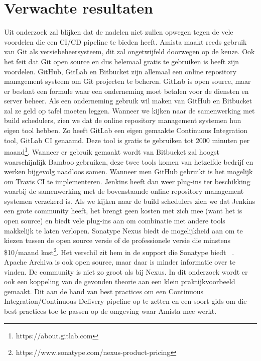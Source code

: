     \section{Verwachte resultaten}
    \label{sec:verwachte_resultaten}
    
    Uit onderzoek zal blijken dat de nadelen niet zullen opwegen tegen de vele voordelen die een CI/CD pipeline te bieden heeft.
    Amista maakt reeds gebruik van Git als versiebeheersysteem, dit zal ongetwijfeld doorwegen op de keuze. Ook het feit dat Git open source en dus helemaal gratis te gebruiken is heeft zijn voordelen.
    GitHub, GitLab en Bitbucket zijn allemaal een online repository management systeem om Git projecten te beheren.
    GitLab is open source, maar er bestaat een formule waar een onderneming moet betalen voor de diensten en server beheer.
    Als een onderneming gebruik wil maken van GitHub en Bitbucket zal ze geld op tafel moeten leggen. 
    Wanneer we kijken naar de samenwerking met build schedulers, zien we dat de online repository management systemen hun eigen tool hebben. 
    Zo heeft GitLab een eigen gemaakte Continuous Integration tool, GitLab CI genaamd. Deze tool is gratis te gebruiken tot 2000 minuten per maand\footnote{https://about.gitlab.com}.
    Wanneer er gebruik gemaakt wordt van Bitbucket zal hoogst waarschijnlijk Bamboo gebruiken, deze twee tools komen van hetzelfde bedrijf en werken bijgevolg naadloos samen.
    Wanneer men GitHub gebruikt is het mogelijk om Travis CI te implementeren.
    Jenkins heeft dan weer plug-ins ter beschikking waarbij de samenwerking met de bovenstaande online repository management systemen verzekerd is.
    \newline
    Als we kijken naar de build schedulers zien we dat Jenkins een grote community heeft, het brengt geen kosten met zich mee (want het is open source) en biedt vele plug-ins aan om combinatie met andere tools makkelijk te laten verlopen.
    Sonatype Nexus biedt de mogelijkheid aan om te kiezen tussen de open source versie of de professionele versie die minstens \$10/maand kost\footnote{https://www.sonatype.com/nexus-product-pricing}. Het verschil zit hem in de support die Sonatype biedt ~\autocite{OBrien2010}.
    Apache Archiva is ook open source, maar daar is minder informatie over te vinden. De community is niet zo groot als bij Nexus.
    \newline
    In dit onderzoek wordt er ook een koppeling van de gevonden theorie aan een klein praktijkvoorbeeld gemaakt. Dit aan de hand van best practices om een Continuous Integration/Continuous Delivery pipeline op te zetten en een soort gids om die best practices toe te passen op de omgeving waar Amista mee werkt.
    
